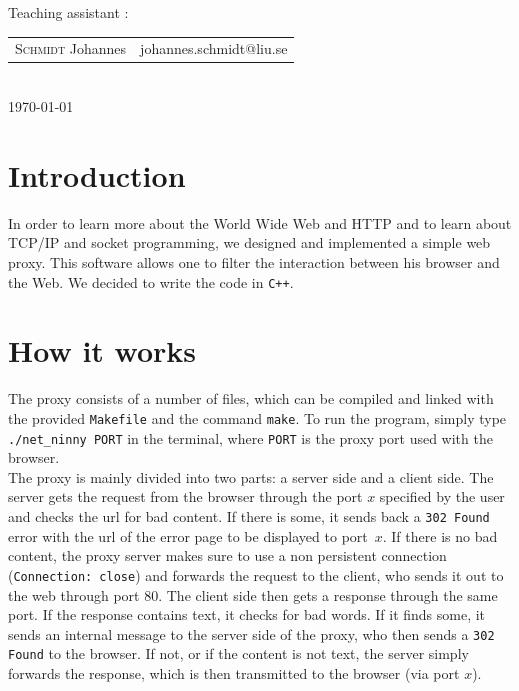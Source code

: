 \documentclass[12pt,a4paper]{article}
\begin{document}
\begin{titlepage}
\normalsize
Teaching assistant :\\[0.2cm]
{\begin{tabular}{ll}
\textsc{Schmidt} Johannes & johannes.schmidt@liu.se \\
\end{tabular}}
\\[2cm]

\vfill
{\normalsize \today} %

\newpage

\end{titlepage}




\section{Introduction}
In order to learn more about the World Wide Web and HTTP and to learn about TCP/IP and socket programming, we designed and implemented a simple web proxy. This software allows one to filter the interaction between his browser and the Web. We decided to write the code in \texttt{C++}.

\section{How it works}
The proxy consists of a number of files, which can be compiled and linked with the provided \texttt{Makefile} and the command \texttt{make}. To run the program, simply type \texttt{./net\_ninny PORT} in the terminal, where \texttt{PORT} is the proxy port used with the browser.\\

The proxy is mainly divided into two parts: a server side and a client side. The server gets the request from the browser through the port $x$ specified by the user and checks the url for bad content. If there is some, it sends back a \texttt{302 Found} error with the url of the error page to be displayed to port~$x$. If there is no bad content, the proxy server makes sure to use a non persistent connection (\texttt{Connection: close}) and forwards the request to the client, who sends it out to the web through port 80. The client side then gets a response through the same port. If the response contains text, it checks for bad words. If it finds some, it sends an internal message to the server side of the proxy, who then sends a \texttt{302 Found} to the browser. If not, or if the content is not text, the server simply forwards the response, which is then transmitted to the browser (via port $x$).
\end{document}
